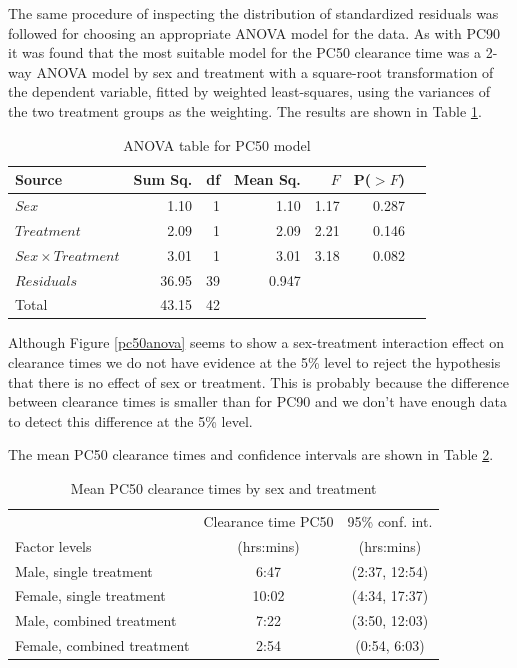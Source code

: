 The same procedure of inspecting the distribution of standardized residuals was followed for choosing an appropriate ANOVA model for the data. As with PC90 it was found that the most suitable model for the PC50 clearance time was a 2-way ANOVA model by sex and treatment with a square-root transformation of the dependent variable, fitted by weighted least-squares, using the variances of the two treatment groups as the weighting. The results are shown in Table \ref{aov50}.
\begin{table}[h]
\centering
\caption{ANOVA table for PC50 model}\label{aov50}
\begin{tabular}{l|rrrrrl}
Source&Sum Sq.&df&Mean Sq.&$F$&P($>F$)\\
\hline
$Sex$				& 1.10 & 1 & 1.10 & 1.17 & 0.287 & \\
$Treatment$			& 2.09   & 1 & 2.09   & 2.21   & 0.146 & \\
$Sex\times Treatment$	& 3.01   & 1 & 3.01   & 3.18   & 0.082 & \\
$Residuals$			& 36.95 & 39 & 0.947 &&&\\
\hline
Total&43.15&42&&&
\end{tabular}
\end{table}

Although Figure \ref{pc50anova} seems to show a sex-treatment interaction effect on clearance times we do not have evidence at the 5\% level to reject the hypothesis that there is no effect of sex or treatment. This is probably because the difference between clearance times is smaller than for PC90 and we don't have enough data to detect this difference at the 5\% level.

The mean PC50 clearance times and confidence intervals are shown in Table \ref{inference50}.
\begin{table}[h]
\centering
\caption{Mean PC50 clearance times by sex and treatment}\label{inference50}
\begin{tabular}{|l|c|c|}
\hline
&Clearance time PC50&95\% conf. int.\\
Factor levels&(hrs:mins)&(hrs:mins)\\
\hline
Male, single treatment 		& 6:47 & (2:37, 12:54) \\
Female, single treatment		& 10:02 & (4:34,  17:37) \\
Male, combined treatment	& 7:22 & (3:50, 12:03) \\
Female, combined treatment	& 2:54 & (0:54, 6:03) \\
\hline
\end{tabular}
\end{table}

